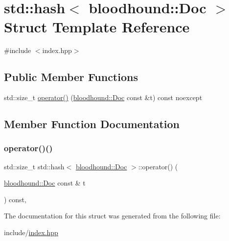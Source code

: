 \hypertarget{structstd_1_1hash_3_01bloodhound_1_1Doc_01_4}{}\section{std\+:\+:hash$<$ bloodhound\+:\+:Doc $>$ Struct Template Reference}
\label{structstd_1_1hash_3_01bloodhound_1_1Doc_01_4}


{\ttfamily \#include $<$index.\+hpp$>$}

\subsection*{Public Member Functions}
\begin{DoxyCompactItemize}
\item 
std\+::size\+\_\+t \mbox{\hyperlink{structstd_1_1hash_3_01bloodhound_1_1Doc_01_4_a3f89deb7b2548010c7f3b63afc9d7fa4}{operator()}} (\mbox{\hyperlink{structbloodhound_1_1Doc}{bloodhound\+::\+Doc}} const \&t) const noexcept
\end{DoxyCompactItemize}


\subsection{Member Function Documentation}
\mbox{\label{structstd_1_1hash_3_01bloodhound_1_1Doc_01_4_a3f89deb7b2548010c7f3b63afc9d7fa4}} 
\subsubsection{\texorpdfstring{operator()()}{operator()()}}
{\footnotesize\ttfamily std\+::size\+\_\+t std\+::hash$<$ \mbox{\hyperlink{structbloodhound_1_1Doc}{bloodhound\+::\+Doc}} $>$\+::operator() (\begin{DoxyParamCaption}\item[{\mbox{\hyperlink{structbloodhound_1_1Doc}{bloodhound\+::\+Doc}} const \&}]{t }\end{DoxyParamCaption}) const\hspace{0.3cm}{\ttfamily [inline]}, {\ttfamily [noexcept]}}



The documentation for this struct was generated from the following file\+:\begin{DoxyCompactItemize}
\item 
include/\mbox{\hyperlink{index_8hpp}{index.\+hpp}}\end{DoxyCompactItemize}
